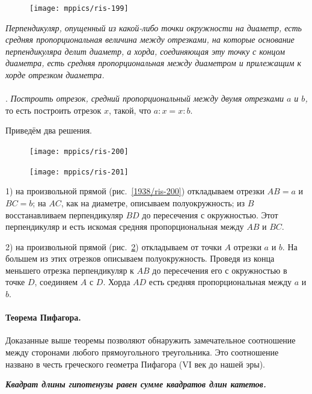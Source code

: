 \documentclass[oneside]{book}
\begin{document}
\begin{figure}
\centering
\texttt{[image: mppics/ris-199]}
\caption{}\label{1938/ris-199}
\end{figure}

\emph{Перпендикуляр, опущенный из какой-либо точки окружности на диаметр, есть средняя пропорциональная величина между отрезками, на которые основание перпендикуляра делит диаметр, а хорда, соединяющая эту точку с концом диаметра, есть средняя пропорциональная между диаметром и прилежащим к хорде отрезком диаметра.}

\paragraph{}\label{1938/190}
.
\emph{Построить отрезок, средний пропорциональный между двумя отрезками $a$ и $b$,}
то есть построить отрезок $x$, такой, что $a:x= x:b$.

Приведём два решения.

\begin{figure}
\centering
\texttt{[image: mppics/ris-200]}
\caption{}\label{1938/ris-200}
\bigskip
\texttt{[image: mppics/ris-201]}
\caption{}\label{1938/ris-201}
\end{figure}

1) на произвольной прямой (рис.~\ref{1938/ris-200}) откладываем отрезки $AB=a$ и $BC=b$;
на $AC$, как на диаметре, описываем полуокружность;
из $B$ восстанавливаем перпендикуляр $BD$ до пересечения с окружностью.
Этот перпендикуляр и есть искомая средняя пропорциональная между $AB$ и $BC$.

2) на произвольной прямой (рис.~\ref{1938/ris-201}) откладываем от точки $A$ отрезки $a$ и $b$.
На большем из этих отрезков описываем полуокружность.
Проведя из конца меньшего отрезка перпендикуляр к $AB$ до пересечения его с окружностью в точке $D$, соединяем $A$ с $D$.
Хорда $AD$ есть средняя пропорциональная между $a$ и $b$.

\paragraph{Теорема Пифагора.}\label{1938/191}
Доказанные выше теоремы позволяют обнаружить замечательное соотношение между сторонами любого прямоугольного треугольника.
Это соотношение названо в честь греческого геометра Пифагора (VI век до нашей эры).

\textbf{\emph{Квадрат длины гипотенузы равен сумме квадратов длин катетов.}} 
\end{document}
